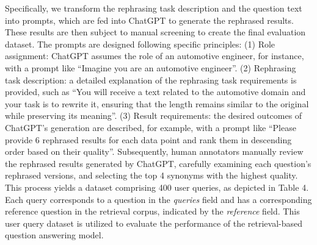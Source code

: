 \documentclass[mathematics,article,submit,moreauthors]{Definitions/mdpi}
\newcommand{\1}[1]{\mathds{1}\left[#1\right]}
\begin{document}
Specifically, we transform the rephrasing task description and the question text into prompts, which are fed into ChatGPT to generate the rephrased results. These results are then subject to manual screening to create the final evaluation dataset. The prompts are designed following specific principles: (1) Role assignment: ChatGPT assumes the role of an automotive engineer, for instance, with a prompt like ``Imagine you are an automotive engineer''. (2) Rephrasing task description: a detailed explanation of the rephrasing task requirements is provided, such as ``You will receive a text related to the automotive domain and your task is to rewrite it, ensuring that the length remains similar to the original while preserving its meaning''. (3) Result requirements: the desired outcomes of ChatGPT's generation are described, for example, with a prompt like ``Please provide 6 rephrased results for each data point and rank them in descending order based on their quality''. Subsequently, human annotators manually review the rephrased results generated by ChatGPT, carefully examining each question's rephrased versions, and selecting the top 4 synonyms with the highest quality. This process yields a dataset comprising 400 user queries, as depicted in Table 4. Each query corresponds to a question in the {\em queries} field and has a corresponding reference question in the retrieval corpus, indicated by the {\em reference} field. This user query dataset is utilized to evaluate the performance of the retrieval-based question answering model.
\end{document}
